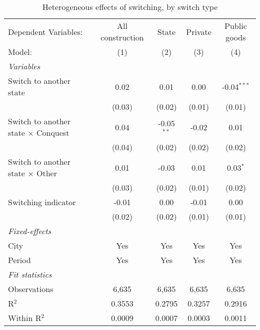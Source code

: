 \begin{table}[htbp]
   \caption{\label{tab:baseline_50y} Heterogeneous effects of switching, by switch type}
   \centering
   \begin{tabular}{lcccc}
      \tabularnewline \midrule \midrule
      Dependent Variables:                       & All construction & State        & Private & Public goods\\  
      Model:                                     & (1)              & (2)          & (3)     & (4)\\  
      \midrule
      \emph{Variables}\\
      Switch to another state                    & 0.02             & 0.01         & 0.00    & -0.04$^{***}$\\   
                                                 & (0.03)           & (0.02)       & (0.01)  & (0.01)\\   
      Switch to another state $\times$ Conquest  & 0.04             & -0.05$^{**}$ & -0.02   & 0.01\\   
                                                 & (0.04)           & (0.02)       & (0.02)  & (0.02)\\   
      Switch to another state $\times$ Other     & 0.01             & -0.03        & 0.01    & 0.03$^{*}$\\   
                                                 & (0.03)           & (0.02)       & (0.01)  & (0.02)\\   
      Switching indicator                        & -0.01            & 0.00         & -0.01   & 0.00\\   
                                                 & (0.02)           & (0.02)       & (0.01)  & (0.01)\\   
      \midrule
      \emph{Fixed-effects}\\
      City                                       & Yes              & Yes          & Yes     & Yes\\  
      Period                                     & Yes              & Yes          & Yes     & Yes\\  
      \midrule
      \emph{Fit statistics}\\
      Observations                               & 6,635            & 6,635        & 6,635   & 6,635\\  
      R$^2$                                      & 0.3553           & 0.2795       & 0.3257  & 0.2916\\  
      Within R$^2$                               & 0.0009           & 0.0007       & 0.0003  & 0.0011\\  
      \midrule \midrule
      

\end{tabular}
\end{table}

